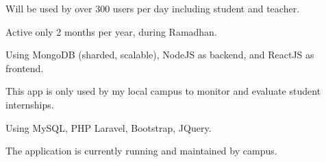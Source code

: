 \documentclass[letterpaper]{deedy-resume} %
\begin{document}
\begin{minipage}[t]{0.66\textwidth}
\begin{tightitemize}
\item Will be used by over 300 users per day including student and teacher.
\item Active only 2 months per year, during Ramadhan.
\item Using MongoDB (sharded, scalable), NodeJS as backend, and ReactJS as frontend.
\end{tightitemize}
\sectionspace

\begin{tightitemize}
\item This app is only used by my local campus to monitor and evaluate student internships.
\item Using MySQL, PHP Laravel, Bootstrap, JQuery.
\item The application is currently running and maintained by campus.
\end{tightitemize}
\sectionspace







\end{minipage} %
\end{document}
